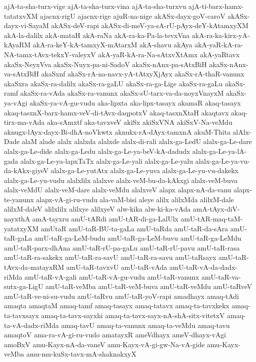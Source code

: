 {ajA-ta-sha-turx-vige
ajA-ta-sha-turx-vina
ajA-ta-sha-turxvu
ajA-ti-barx-hamx-tatatxvXM
ajacnx-rigU
ajacnx-rige
ajuR-na-nige
akASx-dayx-goV-caroV
akASx-dayx-vi-SayaM
akASx-deV-rapi
akASx-di-meV-ya-sA-rU-pAyx-deY-kAtamxyXM
akA-la-dalilx
akA-mataH
akA-raNa
akA-ra-ka-Pa-la-tevxVna
akA-ra-ka-kirx-yA-kAyaRM
akA-ra-keY-kA-tamxyX-mAtarxM
akA-shavu
akAya
akA-yaR-kA-ra-NA-tamx-tAvx-tekxY-valeyxV
akA-yaR-kA-ra-Na-sAtxvXtAmx
akA-yaRtavx
akaSx-NeyxVva
akaSx-Nuyx-pa-ni-SadoV
akaSx-nAnx-pa-sAtxBiH
akaSx-nAnx-va-sAtxBiH
akaSxnf
akaSx-rA-na-navx-yA-tAtxyXjAyx
akaSx-rA-thaR-vanunx
akaSxra
akaSx-ra-dalilx
akaSx-ra-gaLU
akaSx-ra-ga-Lige
akaSx-ra-gaLu
akaSx-ramf
akaSx-ra-vAda
akaSx-ra-vanunx
akaSx-sU-tarx-va-da-noyxVnayxM
akaSx-ya-vAgi
akaSx-ya-vA-gu-vudu
aka-lipxta
aka-lipx-tasayx
akamaR
akaq-tasayx
akaq-tasxnX-barx-hamx-veV-di-tAvx-daqpotxV
akaq-tasxnXtaH
akaqtavx
akaq-tirx-ma-vAda
aka-sAmxtf
aka-tavxveV
akiSx
akiSxVNA
akiSxV-Na-veMdu
aknugx-lAyx-dayx-Bi-dhA-noVkwtx
aknukx-rA-dAyx-tamxnA
akuM-Thita
alAlx-Dade
alaM
alade
alalx
alalxda
alalxde
alalx-di-rali
alalx-ga-LedU
alalx-ga-Le-dare
alalx-ga-Le-dide
alalx-ga-Ledu
alalx-ga-Le-ya-beV-kA-dadudx
alalx-ga-Le-ya-lA-gada
alalx-ga-Le-ya-lapxTaTx
alalx-ga-Le-yali
alalx-ga-Le-yalu
alalx-ga-Le-ya-vu-da-kAkx-giyeV
alalx-ga-Le-yutAtx
alalx-ga-Le-yuva
alalx-ga-Le-yu-vu-dakekx
alalx-ga-Le-yu-vudu
alalxlilx
alalxve
alalx-veM-bu-da-kAkxgi
alalx-veM-buva
alalx-veMdU
alalx-veM-dare
alalx-veMdu
alalxveV
alapx
alapx-nA-da-vanu
alapx-te-yanunx
alapx-vA-gi-ru-vudu
ala-vaM-bisi
aleye
alilx
alilxMda
alilxM-dale
alilxM-daleV
alilxlilx
alilxye
alilxyeV
alw-kika
alw-ki-ka-vAda
amA-tAyx-diV-nayxthA
amA-tayxru
amU-tARdi
amU-tAR-di-ga-LalUlx
amU-tAR-maq-taM-yatatxyXM
amUtaR
amU-taR-BU-ta-gaLa
amU-taRda
amU-taR-da-sAra
amU-taR-gaLa
amU-taR-ga-LeM-budu
amU-taR-ga-LeM-buvu
amU-taR-ga-LeMdu
amU-taR-parx-dhAna
amU-taR-rU-pa-gaLu
amU-taR-rU-pavu
amU-taR-rasa
amU-taR-ra-sakekx
amU-taR-ra-savU
amU-taR-ra-savu
amU-taRsayx
amU-taR-tAvx-da-matayxRM
amU-taR-tavxvU
amU-taR-vAda
amU-taR-vA-da-dadx-riMda
amU-taR-vA-gali
amU-taR-vA-gu-vudu
amU-taR-vanunx
amU-taR-va-sutx-ga-LigU
amU-taR-veMba
amU-taR-veM-buva
amU-taR-veMdu
amU-taRveV
amU-taR-ve-ni-su-vudu
amU-taRvu
amU-taR-yoV-rapi
amadhayx
amaq-tAdi
amaqta
amaqtaM
amaq-tamf
amaq-tasayx
amaq-tatavx
amaq-ta-tavxkekx
amaq-ta-tavxsayx
amaq-ta-tavx-sayxhi
amaq-ta-tavx-sayx-nA-shA-sitx-vitetxV
amaq-ta-vA-dadx-riMda
amaq-tavU
amaq-ta-vanunx
amaq-ta-veMdu
amaq-tavu
amaqtoV
ama-ra-vA-gi-ru-vudo
amatayxR
ameVdhayx
ameV-dhayx-vAgi
amoBxV
amu-Kayx-nA-da-vaneV
amu-Kayx-vA-gi-gw-Na-vA-gide
amu-Kayx-veMba
amu-mu-kuSx-tavx-mA-shaknakxyX
}
